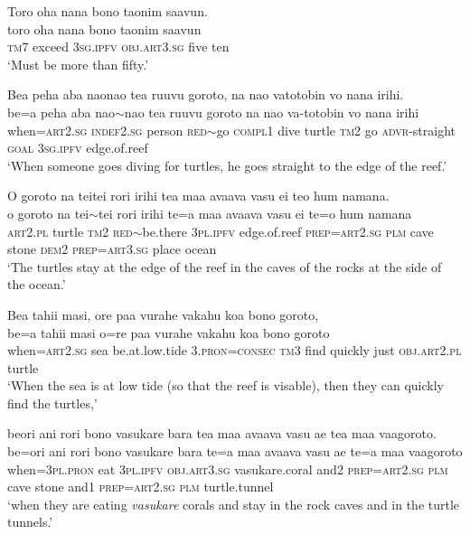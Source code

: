 \ea\label{ex:text19-17}
Toro oha nana bono taonim saavun.\\
\gll toro	oha	nana	bono	taonim	saavun\\
     \textsc{tm}7	exceed	3\textsc{sg}.\textsc{ipfv}	\textsc{obj}.\textsc{art}3.\textsc{sg}	five	ten\\
\glt `Must be more than fifty.'
\z

\newpage
\ea\label{ex:text19-18}
Bea peha aba naonao tea ruuvu goroto, na nao vatotobin vo nana irihi.\\
\gll be=a	peha	aba	nao{$\sim$}nao	tea	ruuvu	goroto	na	nao	va-totobin	vo	nana	irihi\\
     when=\textsc{art}2.\textsc{sg}	\textsc{indef}2.\textsc{sg}	person	\textsc{red}{$\sim$}go	\textsc{compl}1	dive	turtle	\textsc{tm}2	go	\textsc{advr}-straight	\textsc{goal}	3\textsc{sg}.\textsc{ipfv}	edge.of.reef\\
\glt `When someone goes diving for turtles, he goes straight to the edge of the reef.'
\z

\ea\label{ex:text19-19}
O goroto na teitei rori irihi tea maa avaava vasu ei teo hum namana.\\
\gll o	goroto	na	tei{$\sim$}tei	rori	irihi	te=a	maa	avaava	vasu	ei	te=o	hum	namana\\
     \textsc{art}2.\textsc{pl}	turtle	\textsc{tm}2	\textsc{red}{$\sim$}be.there	3\textsc{pl}.\textsc{ipfv}	edge.of.reef	\textsc{prep}=\textsc{art}2.\textsc{sg}	\textsc{plm}	cave	stone	\textsc{dem}2	\textsc{prep}=\textsc{art}3.\textsc{sg}	place	ocean\\
\glt `The turtles stay at the edge of the reef in the caves of the rocks at the side of the ocean.'
\z

\ea\label{ex:text19-20}
Bea tahii masi, ore paa vurahe vakahu koa bono goroto,\\
\gll be=a	tahii	masi	o=re	paa	vurahe	vakahu	koa	bono	goroto\\
     when=\textsc{art}2.\textsc{sg}	sea	be.at.low.tide	3.\textsc{pron}=\textsc{consec}	\textsc{tm}3	find	quickly	just	\textsc{obj}.\textsc{art}2.\textsc{pl}	turtle\\
\glt `When the sea is at low tide (so that the reef is visable), then they can quickly find the turtles,'
\z

\ea\label{ex:text19-21}
beori ani rori bono vasukare bara tea maa avaava vasu ae tea maa vaagoroto.\\
\gll be=ori	ani	rori	bono	vasukare	bara	te=a	maa	avaava	vasu	ae	te=a	maa	vaagoroto\\
     when=3\textsc{pl}.\textsc{pron}	eat	3\textsc{pl}.\textsc{ipfv}	\textsc{obj}.\textsc{art}3.\textsc{sg}	vasukare.coral	and2	\textsc{prep}=\textsc{art}2.\textsc{sg}	\textsc{plm}	cave	stone	and1	\textsc{prep}=\textsc{art}2.\textsc{sg}	\textsc{plm}	turtle.tunnel\\
\glt `when they are eating \textit{vasukare} corals and stay in the rock caves and in the turtle tunnels.'
\z

